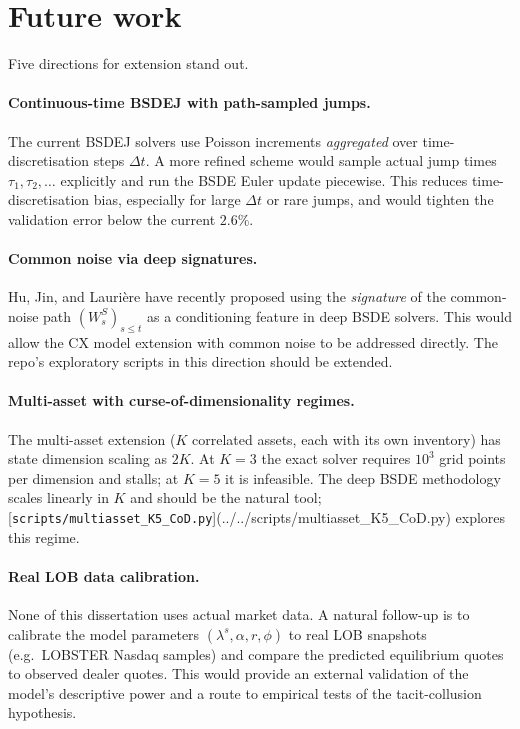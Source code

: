 \section{Future work}
\label{sec:future-work}

Five directions for extension stand out.

\paragraph{Continuous-time BSDEJ with path-sampled jumps.}  The current BSDEJ solvers use Poisson increments \emph{aggregated} over time-discretisation steps $\Delta t$. A more refined scheme would sample actual jump times $\tau_1, \tau_2, \ldots$ explicitly and run the BSDE Euler update piecewise. This reduces time-discretisation bias, especially for large $\Delta t$ or rare jumps, and would tighten the validation error below the current $2.6\%$.

\paragraph{Common noise via deep signatures.}  Hu, Jin, and Lauri\`ere \cite{hu2025} have recently proposed using the \emph{signature} of the common-noise path $(W^S_s)_{s \leq t}$ as a conditioning feature in deep BSDE solvers. This would allow the CX model extension with common noise to be addressed directly. The repo's exploratory scripts in this direction should be extended.

\paragraph{Multi-asset with curse-of-dimensionality regimes.}  The multi-asset extension ($K$ correlated assets, each with its own inventory) has state dimension scaling as $2K$. At $K = 3$ the exact solver requires $10^3$ grid points per dimension and stalls; at $K = 5$ it is infeasible. The deep BSDE methodology scales linearly in $K$ and should be the natural tool; [\texttt{scripts/multiasset\_K5\_CoD.py}](../../scripts/multiasset_K5_CoD.py) explores this regime.

\paragraph{Real LOB data calibration.}  None of this dissertation uses actual market data. A natural follow-up is to calibrate the model parameters $(\lambda^s, \alpha, r, \phi)$ to real LOB snapshots (e.g.\ LOBSTER Nasdaq samples) and compare the predicted equilibrium quotes to observed dealer quotes. This would provide an external validation of the model's descriptive power and a route to empirical tests of the tacit-collusion hypothesis.

